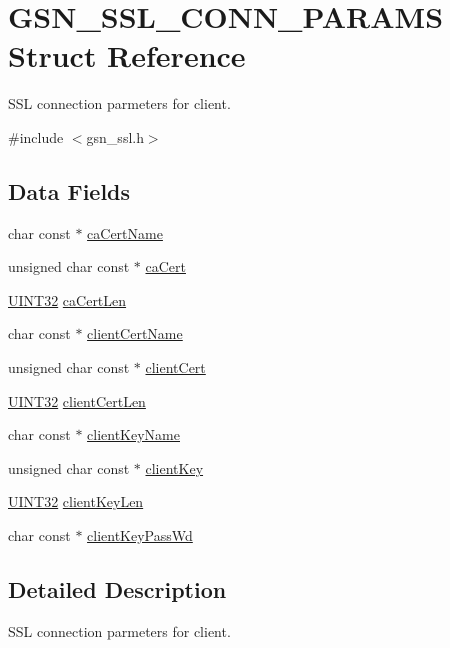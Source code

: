 \hypertarget{a00242}{
\section{GSN\_\-SSL\_\-CONN\_\-PARAMS Struct Reference}
\label{a00242}
}


SSL connection parmeters for client.  




{\ttfamily \#include $<$gsn\_\-ssl.h$>$}

\subsection*{Data Fields}
\begin{DoxyCompactItemize}
\item 
char const $\ast$ \hyperlink{a00242_ab83658b0000e25e77ac261d971673a1e}{caCertName}
\item 
unsigned char const $\ast$ \hyperlink{a00242_ada71ec9e7be06c5f184a682d27888ae3}{caCert}
\item 
\hyperlink{a00660_gae1e6edbbc26d6fbc71a90190d0266018}{UINT32} \hyperlink{a00242_a91a9fb29070a3ee80937f9e601dc2335}{caCertLen}
\item 
char const $\ast$ \hyperlink{a00242_add5887359d6c779b4e2a5b5e9d5faf83}{clientCertName}
\item 
unsigned char const $\ast$ \hyperlink{a00242_a33d2c57e30a54c929d9e40083385a04a}{clientCert}
\item 
\hyperlink{a00660_gae1e6edbbc26d6fbc71a90190d0266018}{UINT32} \hyperlink{a00242_ac5992c4484c851247e76e7a2dc9af875}{clientCertLen}
\item 
char const $\ast$ \hyperlink{a00242_a2203525d961db49ecc3177156556e906}{clientKeyName}
\item 
unsigned char const $\ast$ \hyperlink{a00242_af732e29f30802c9ef73516d35c0af353}{clientKey}
\item 
\hyperlink{a00660_gae1e6edbbc26d6fbc71a90190d0266018}{UINT32} \hyperlink{a00242_a1da68c7fbd1e18b5ce1751b88d8926cc}{clientKeyLen}
\item 
char const $\ast$ \hyperlink{a00242_a7f9f04338bf689b3ec40d031aeae41a9}{clientKeyPassWd}
\end{DoxyCompactItemize}


\subsection{Detailed Description}
SSL connection parmeters for client. 


